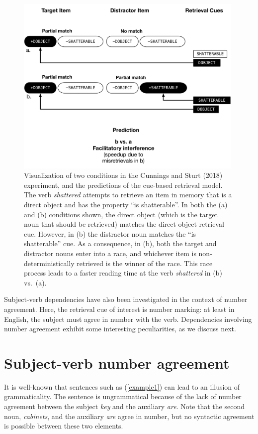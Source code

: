 \documentclass{cambridge7A}\usepackage[]{graphicx}\usepackage[]{color}
\begin{document}
 \begin{figure}[!htbp]
\centering
\includegraphics[width=11cm]{figures/c02cs2018implausible.pdf}
\caption{Visualization of two conditions in the Cunnings and Sturt (2018) experiment, and the predictions of the cue-based retrieval model. The verb \textit{shattered} attempts to retrieve an item in memory that is a direct object and has the property ``is shatterable''. In both the (a) and (b) conditions shown, the direct object (which is the  target noun that should be retrieved) matches the direct object retrieval cue. However, in (b) the distractor noun matches the ``is shatterable'' cue. As a consequence, in (b), both  the target and distractor nouns enter into a race, and whichever item is non-deterministically retrieved is the winner of the race. This race process leads to a faster reading time at the verb \textit{shattered} in (b) vs.\ (a).} \label{fig:cunningssturt}
\end{figure}

Subject-verb dependencies have also been investigated in the context of  number agreement. Here, the retrieval cue of interest is number marking: at least in English, the subject must agree in number with the verb. Dependencies involving number agreement exhibit some interesting peculiarities, as we discuss next.

\section{Subject-verb number agreement} 

It is well-known that sentences such as (\ref{example1}) 
can lead to an illusion of grammaticality.  The sentence is 
ungrammatical because of the lack of number agreement between 
the subject \textit{key} and the auxiliary \textit{are}.
Note that the second noun, \textit{cabinets}, and the auxiliary \textit{are} agree in number, but no syntactic agreement is possible between these two elements.
\end{document}
